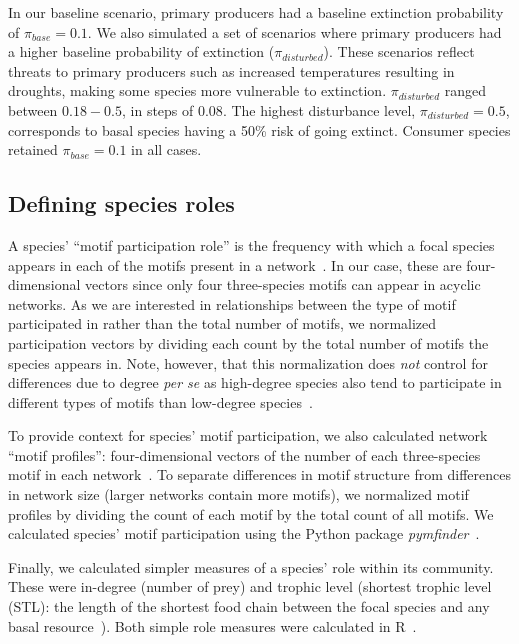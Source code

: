 \documentclass[12pt]{article}
\begin{document}
\begin{spacing}{2.0}
		
        In our baseline scenario, primary producers had a baseline extinction probability of $\pi_{base} = 0.1$. 
		We also simulated a set of scenarios where primary producers had a higher baseline probability of extinction ($\pi_{disturbed}$). 
		These scenarios reflect threats to primary producers such as increased temperatures resulting in droughts, making some species more vulnerable to extinction.
		$\pi_{disturbed}$ ranged between $0.18-0.5$, in steps of $0.08$. 
		The highest disturbance level, $\pi_{disturbed} = 0.5$, corresponds to basal species having a 50\% risk of going extinct. 
		Consumer species retained $\pi_{base}=0.1$ in all cases.
		
	\subsection*{Defining species roles}

        A species' ``motif participation role'' is the frequency with which a focal species appears in each of the motifs present in a network~\citep{Stouffer2012}.
        In our case, these are four-dimensional vectors since only four three-species motifs can appear in acyclic networks.
        As we are interested in relationships between the type of motif participated in rather than the total number of motifs, we normalized participation vectors by dividing each count by the total number of motifs the species appears in.
        Note, however, that this normalization does \emph{not} control for differences due to degree \emph{per se} as high-degree species also tend to participate in different types of motifs than low-degree species~\citep{Cirtwill2021_inprep}.
        
        
        To provide context for species' motif participation, we also calculated network ``motif profiles'': four-dimensional vectors of the number of each three-species motif in each network~\citep{Stouffer2012}.
        To separate differences in motif structure from differences in network size (larger networks contain more motifs), we normalized motif profiles by dividing the count of each motif by the total count of all motifs. 
		We calculated species' motif participation using the Python package \emph{pymfinder}~\citep{pymfinder}.


        Finally, we calculated simpler measures of a species' role within its community.
        These were in-degree (number of prey) and trophic level (shortest trophic level (STL): the length of the shortest food chain between the focal species and any basal resource~\citep{Williams2004}).
        Both simple role measures were calculated in R~\citep{R}.
        



\end{spacing}
\end{document}
